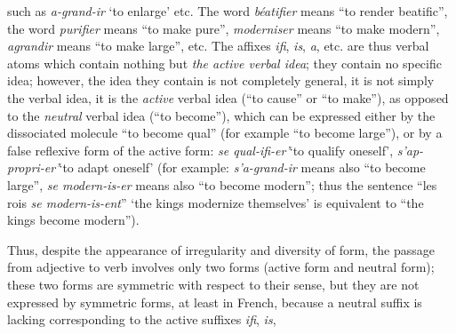 \begin{sloppypar}
{   }
   {\noindent
     such as \emph{a-grand-ir} `to enlarge' etc. The word
     \emph{béatifier} means ``to render beatific'', the word
     \emph{purifier} means ``to make pure'', \emph{moderniser} means
     ``to make modern'', \emph{agrandir} means ``to make large'', etc.
     The affixes \emph{ifi}, \emph{is}, \emph{a}, etc. are thus verbal
     atoms which contain nothing but \emph{the active verbal idea};
     they contain no specific idea; however, the idea they contain is
     not completely general, it is not simply the verbal idea, it is
     the \emph{active} verbal idea (``to cause'' or ``to make''), as
     opposed to the \emph{neutral} verbal idea (``to become''), which
     can be expressed either by the dissociated molecule ``to become
     qual'' (for example ``to become large''), or by a false reflexive
     form of the active form: \emph{se qual-ifi-er'}`to qualify
     oneself', \emph{s'ap-propri-er'}`to adapt oneself' (for example:
     \emph{s'a-grand-ir} means also ``to become large'', \emph{se
       modern-is-er} means also ``to become modern''; thus the
     sentence ``les rois \emph{se modern-is-ent}'' `the kings
     modernize themselves' is equivalent to ``the kings become
     modern'').

     Thus, despite the appearance of irregularity and diversity of
     form, the passage from adjective to verb involves only two forms
     (active form and neutral form); these two forms are symmetric
     with respect to their sense, but they are not expressed by
     symmetric forms, at least in French, because a neutral suffix is
     lacking corresponding to the active suffixes \emph{ifi}, \emph{is},

   }

\end{sloppypar}
